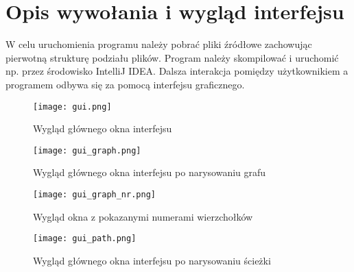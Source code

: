 \documentclass[]{article}
\begin{document}
\section{Opis wywołania i wygląd interfejsu}\label{header-n233}
W celu uruchomienia programu należy pobrać pliki źródłowe zachowując pierwotną strukturę podziału plików. Program należy skompilować i uruchomić np. przez środowisko IntelliJ IDEA.
Dalsza interakcja pomiędzy użytkownikiem a programem odbywa się za pomocą interfejsu graficznego.

\begin{figure}[H]
\begin{center}
  \texttt{[image: gui.png]}
  \end{center}
  \caption{Wygląd głównego okna interfejsu}
  \label{fig:graf}
\end{figure}

\begin{figure}[H]
\begin{center}
  \texttt{[image: gui\_graph.png]}
  \end{center}
  \caption{Wygląd głównego okna interfejsu po narysowaniu grafu}
  \label{fig:graf}
\end{figure}

\begin{figure}[H]
\begin{center}
  \texttt{[image: gui\_graph\_nr.png]}
  \end{center}
  \caption{Wygląd okna z pokazanymi numerami wierzchołków}
  \label{fig:graf}
\end{figure}

\begin{figure}[H]
\begin{center}
  \texttt{[image: gui\_path.png]}
  \end{center}
  \caption{Wygląd głównego okna interfejsu po narysowaniu ścieżki}
  \label{fig:graf}
\end{figure}
\end{document}
